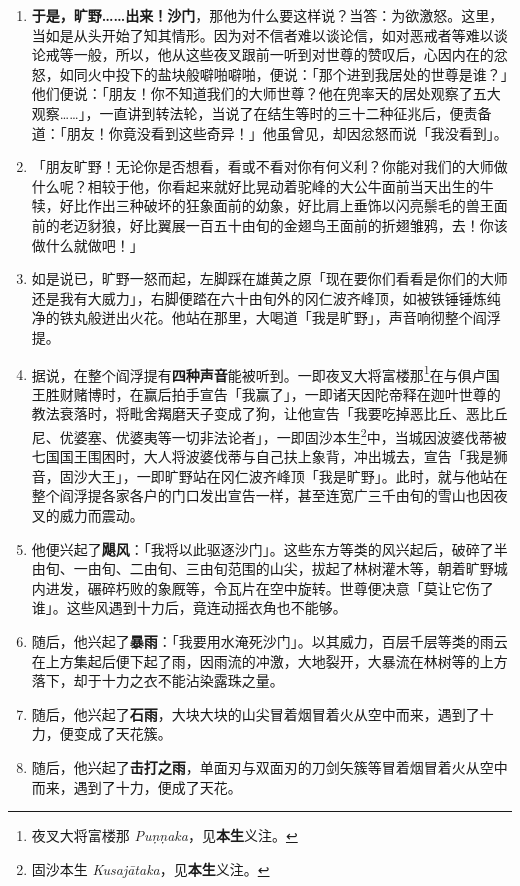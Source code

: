 \begin{enumerate}\item \textbf{于是，旷野……出来！沙门}，那他为什么要这样说？当答：为欲激怒。这里，当如是从头开始了知其情形。因为对不信者难以谈论信，如对恶戒者等难以谈论戒等一般，所以，他从这些夜叉跟前一听到对世尊的赞叹后，心因内在的忿怒，如同火中投下的盐块般噼啪噼啪，便说：「那个进到我居处的世尊是谁？」他们便说：「朋友！你不知道我们的大师世尊？他在兜率天的居处观察了五大观察……」，一直讲到转法轮，当说了在结生等时的三十二种征兆后，便责备道：「朋友！你竟没看到这些奇异！」他虽曾见，却因忿怒而说「我没看到」。
\item 「朋友旷野！无论你是否想看，看或不看对你有何义利？你能对我们的大师做什么呢？相较于他，你看起来就好比晃动着驼峰的大公牛面前当天出生的牛犊，好比作出三种破坏的狂象面前的幼象，好比肩上垂饰以闪亮鬃毛的兽王面前的老迈豺狼，好比翼展一百五十由旬的金翅鸟王面前的折翅雏鸦，去！你该做什么就做吧！」
\item 如是说已，旷野一怒而起，左脚踩在雄黄之原「现在要你们看看是你们的大师还是我有大威力」，右脚便踏在六十由旬外的冈仁波齐峰顶，如被铁锤锤炼纯净的铁丸般迸出火花。他站在那里，大喝道「我是旷野」，声音响彻整个阎浮提。
\item 据说，在整个阎浮提有\textbf{四种声音}能被听到。一即夜叉大将富楼那\footnote{夜叉大将富楼那 \textit{Puṇṇaka}，见\textbf{本生}义注。}在与俱卢国王胜财赌博时，在赢后拍手宣告「我赢了」，一即诸天因陀帝释在迦叶世尊的教法衰落时，将毗舍羯磨天子变成了狗，让他宣告「我要吃掉恶比丘、恶比丘尼、优婆塞、优婆夷等一切非法论者」，一即固沙本生\footnote{固沙本生 \textit{Kusajātaka}，见\textbf{本生}义注。}中，当城因波婆伐蒂被七国国王围困时，大人将波婆伐蒂与自己扶上象背，冲出城去，宣告「我是狮音，固沙大王」，一即旷野站在冈仁波齐峰顶「我是旷野」。此时，就与他站在整个阎浮提各家各户的门口发出宣告一样，甚至连宽广三千由旬的雪山也因夜叉的威力而震动。
\item 他便兴起了\textbf{飓风}：「我将以此驱逐沙门」。这些东方等类的风兴起后，破碎了半由旬、一由旬、二由旬、三由旬范围的山尖，拔起了林树灌木等，朝着旷野城内进发，碾碎朽败的象厩等，令瓦片在空中旋转。世尊便决意「莫让它伤了谁」。这些风遇到十力后，竟连动摇衣角也不能够。
\item 随后，他兴起了\textbf{暴雨}：「我要用水淹死沙门」。以其威力，百层千层等类的雨云在上方集起后便下起了雨，因雨流的冲激，大地裂开，大暴流在林树等的上方落下，却于十力之衣不能沾染露珠之量。
\item 随后，他兴起了\textbf{石雨}，大块大块的山尖冒着烟冒着火从空中而来，遇到了十力，便变成了天花簇。
\item 随后，他兴起了\textbf{击打之雨}，单面刃与双面刃的刀剑矢簇等冒着烟冒着火从空中而来，遇到了十力，便成了天花。

\end{enumerate}
